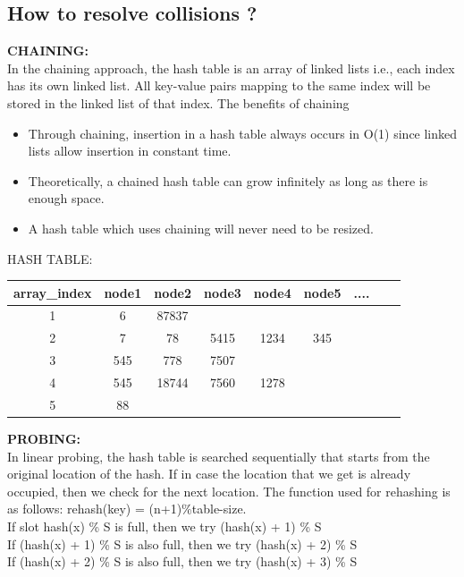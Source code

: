 \documentclass{report}
\begin{document}
\subsection{\large How to resolve collisions ?}
\textbf{CHAINING:}\\
In the chaining approach, the hash table is an array of linked lists i.e., each index has its own linked list.
All key-value pairs mapping to the same index will be stored in the linked list of that index.
The benefits of chaining
\begin{itemize}
    \item Through chaining, insertion in a hash table always occurs in O(1) since linked lists allow insertion in constant time.

    \item Theoretically, a chained hash table can grow infinitely as long as there is enough space.

    \item A hash table which uses chaining will never need to be resized.

\end{itemize}
HASH TABLE: \\
\begin{center}
\begin{tabular}{|c|c|c|c|c|c|c|c|c|} 
 \hline
 array\_index & node1 & node2 & node3 & node4 & node5 & ....\\ [1ex]
 \hline\hline
 1 & 6 & 87837  \\ 
 \hline
 2 & 7 & 78 & 5415 & 1234 & 345\\
 \hline
 3 & 545 & 778 & 7507 \\
 \hline
 4 & 545 & 18744 & 7560 & 1278\\
 \hline
 5 & 88 \\ [1ex] 
 \hline
\end{tabular}
\end{center}
\newpage 
\textbf{PROBING:}\\
In linear probing\cite{3}, the hash table is searched sequentially that starts from the original location of the hash. If in case the location that we get is already occupied, then we check for the next location. 
The function used for rehashing is as follows: rehash(key) = (n+1)\%table-size.\\
If slot hash(x) \% S is full, then we try (hash(x) + 1) \% S\\
If (hash(x) + 1) \% S is also full, then we try (hash(x) + 2) \% S\\
If (hash(x) + 2) \% S is also full, then we try (hash(x) + 3) \% S \\
\end{document}
